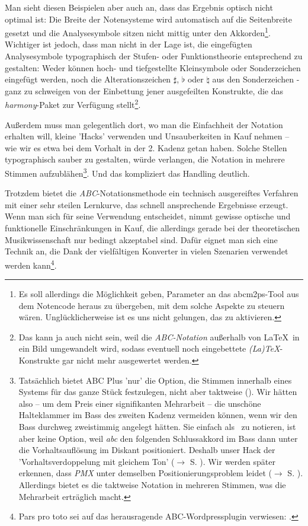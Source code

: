 Man sieht diesen Beispielen aber auch an, dass das Ergebnis optisch nicht
optimal ist: Die Breite der Notensysteme wird automatisch auf die Seitenbreite
gesetzt und die Analysesymbole sitzen nicht mittig unter den
Akkorden\footnote{Es soll allerdings die Möglichkeit geben, Parameter an das
abcm2ps-Tool aus dem Notencode heraus zu übergeben, mit dem solche Aspekte zu
steuern wären. Unglücklicherweise ist es uns nicht gelungen, das zu
aktivieren.}. \label{AppraisalABC}Wichtiger ist jedoch, dass man nicht in der
Lage ist, die eingefügten Analysesymbole typographisch der Stufen- oder
Funktionstheorie entsprechend zu gestalten: Weder können hoch- und tiefgestellte
Kleinsymbole oder Sonderzeichen eingefügt werden, noch die Alterationszeichen
$\sharp$, $\flat$ oder $\natural$ aus den Sonderzeichen - ganz zu schweigen von
der Einbettung jener ausgefeilten Konstrukte, die das \emph{harmony}-Paket zur
Verfügung stellt\footnote{Das kann ja auch nicht sein, weil die
\emph{ABC-Notation} außerhalb von \LaTeX\ in ein Bild umgewandelt wird, sodass
eventuell noch eingebettete \emph{(La)\TeX}-Konstrukte gar nicht mehr
ausgewertet werden.}.

Außerdem muss man gelegentlich dort, wo man die Einfachheit der Notation
erhalten will, kleine 'Hacks' verwenden und Unsauberkeiten in Kauf nehmen -- wie
wir es etwa bei dem Vorhalt in der 2. Kadenz getan haben. Solche Stellen
typographisch sauber zu gestalten, würde verlangen, die Notation in mehrere
Stimmen aufzublähen\footnote{Tatsächlich bietet ABC Plus 'nur' die Option, die
Stimmen innerhalb eines Systems für das ganze Stück festzulegen, nicht aber
taktweise (\cite[vgl.][49f]{Gonzato2018b}). Wir hätten also -- um dem Preis einer
signifikanten Mehrarbeit -- die unschöne Halteklammer im Bass des zweiten Kadenz
vermeiden können, wenn wir den Bass durchweg zweistimmig angelegt hätten. Sie
einfach als \Halb\ zu notieren, ist aber keine Option, weil \emph{abc} den
folgenden Schlussakkord im Bass dann unter die Vorhaltsauflösung im Diskant
positioniert. Deshalb unser Hack der 'Vorhaltsverdoppelung mit gleichem Ton'
($\rightarrow$ S. ). Wir werden später erkennen, dass
\emph{PMX} unter demselben Positionierungsproblem leidet ($\rightarrow$ S.
). Allerdings bietet es die taktweise Notation in
mehreren Stimmen, was die Mehrarbeit erträglich macht.
}. Und das kompliziert das Handling deutlich.

Trotzdem bietet die \emph{ABC}-Notationsmethode ein technisch ausgereiftes
Verfahren mit einer sehr steilen Lernkurve, das schnell ansprechende Ergebnisse
erzeugt. Wenn man sich für seine Verwendung entscheidet, nimmt gewisse optische
und funktionelle Einschränkungen in Kauf, die allerdings gerade bei der
theoretischen Musikwissenschaft nur bedingt akzeptabel sind. Dafür eignet man
sich eine Technik an, die Dank der vielfältigen Konverter in vielen Szenarien
verwendet werden kann\footnote{Pars pro toto sei auf das herausragende
ABC-Wordpressplugin verwiesen: \cite[vgl.][\nopage wp]{Rosen2018a}.}.
%
